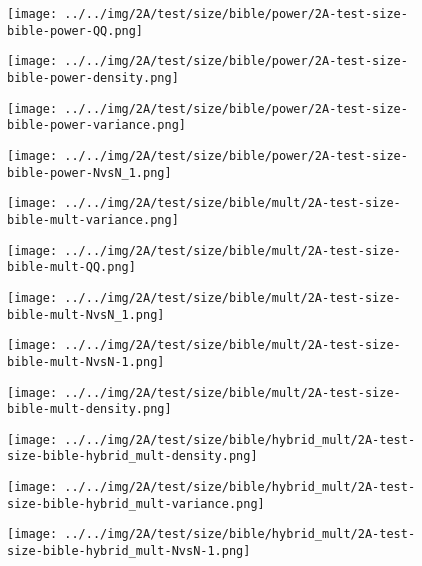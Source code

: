 \begin{figure}[H]
\centering	\texttt{[image: ../../img/2A/test/size/bible/power/2A-test-size-bible-power-QQ.png]}
\end{figure}
\begin{figure}[H]
\centering	\texttt{[image: ../../img/2A/test/size/bible/power/2A-test-size-bible-power-density.png]}
\end{figure}
\begin{figure}[H]
\centering	\texttt{[image: ../../img/2A/test/size/bible/power/2A-test-size-bible-power-variance.png]}
\end{figure}
\begin{figure}[H]
\centering	\texttt{[image: ../../img/2A/test/size/bible/power/2A-test-size-bible-power-NvsN\_1.png]}
\end{figure}
\begin{figure}[H]
\centering	\texttt{[image: ../../img/2A/test/size/bible/mult/2A-test-size-bible-mult-variance.png]}
\end{figure}
\begin{figure}[H]
\centering	\texttt{[image: ../../img/2A/test/size/bible/mult/2A-test-size-bible-mult-QQ.png]}
\end{figure}
\begin{figure}[H]
\centering	\texttt{[image: ../../img/2A/test/size/bible/mult/2A-test-size-bible-mult-NvsN\_1.png]}
\end{figure}
\begin{figure}[H]
\centering	\texttt{[image: ../../img/2A/test/size/bible/mult/2A-test-size-bible-mult-NvsN-1.png]}
\end{figure}
\begin{figure}[H]
\centering	\texttt{[image: ../../img/2A/test/size/bible/mult/2A-test-size-bible-mult-density.png]}
\end{figure}
\begin{figure}[H]
\centering	\texttt{[image: ../../img/2A/test/size/bible/hybrid\_mult/2A-test-size-bible-hybrid\_mult-density.png]}
\end{figure}
\begin{figure}[H]
\centering	\texttt{[image: ../../img/2A/test/size/bible/hybrid\_mult/2A-test-size-bible-hybrid\_mult-variance.png]}
\end{figure}
\begin{figure}[H]
\centering	\texttt{[image: ../../img/2A/test/size/bible/hybrid\_mult/2A-test-size-bible-hybrid\_mult-NvsN-1.png]}
\end{figure}
